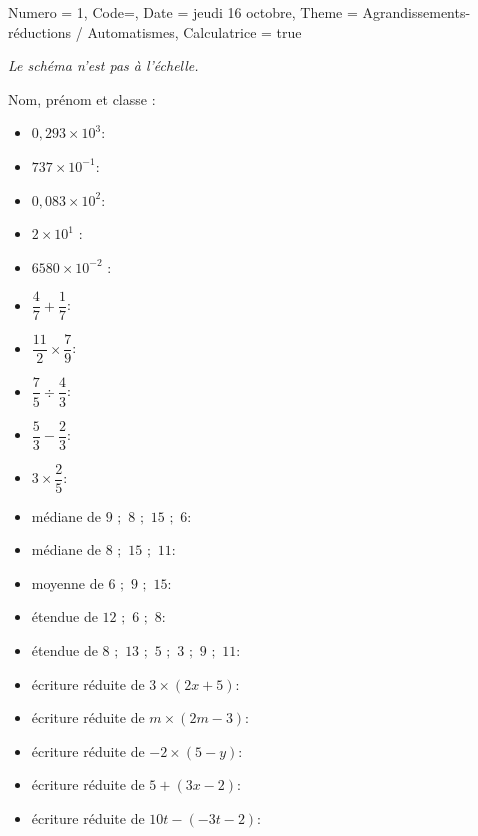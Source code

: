 \documentclass[11pt]{article}
\newcommand{\ligne}{{\color{gray!60}\hrulefill}}
\begin{document}
\begin{Maquette}[IE]{
        Numero = 1, Code={}, Date = jeudi 16 octobre, Theme = Agrandissements-réductions / Automatismes, Calculatrice = true
    }
\begin{exercice}
\begin{multicols}{2}
\begin{center}
                {\small \emph{Le schéma n’est pas à l’échelle.}}
            \end{center}
        \end{multicols}

    \end{exercice}
    \newpage

    Nom, prénom et classe : \ligne

    \vspace{.5cm}

    \begin{exercice}
        \begin{multicols}{2}
            \begin{itemize}[itemsep=10pt]
                \item $0,293 \times 10^3$: \ligne
                \item $737 \times 10^{-1}$: \ligne
                \item $0,083 \times 10^2$: \ligne
                \item $2 \times 10^1$ : \ligne
                \item $6580 \times 10^{-2}$ : \ligne
                \item $\dfrac{4}{7} + \dfrac{1}{7}$: \ligne
                \item $\dfrac{11}{2} \times \dfrac{7}{9}$: \ligne
                \item $\dfrac{7}{5} \div \dfrac{4}{3}$: \ligne
                \item $\dfrac{5}{3} - \dfrac{2}{3}$: \ligne
                \item $3 \times \dfrac{2}{5}$: \ligne
                \item médiane de $9 \,\,;\,\, 8 \,\,;\,\, 15 \,\,;\,\, 6$: \ligne
                \item médiane de $8 \,\,;\,\, 15 \,\,;\,\, 11$: \ligne
                \item moyenne de $6 \,\,;\,\,9\,\,;\,\,15$: \ligne
                \item étendue de $12\,\,;\,\,6\,\,;\,\,8$: \ligne
                \item étendue de $8\,\,;\,\, 13\,\,;\,\, 5\,\,;\,\, 3\,\,;\,\, 9\,\,;\,\,11$: \ligne
                \item écriture réduite de $3 \times (2x+5)$: \ligne
                \item écriture réduite de $m \times (2m - 3)$: \ligne
                \item écriture réduite de $-2 \times (5-y)$: \ligne
                \item écriture réduite de $5+(3x-2)$: \ligne
                \item écriture réduite de $10t - (-3t - 2)$: \ligne
            \end{itemize}
        \end{multicols}
    \end{exercice}
\end{Maquette}
\end{document}
